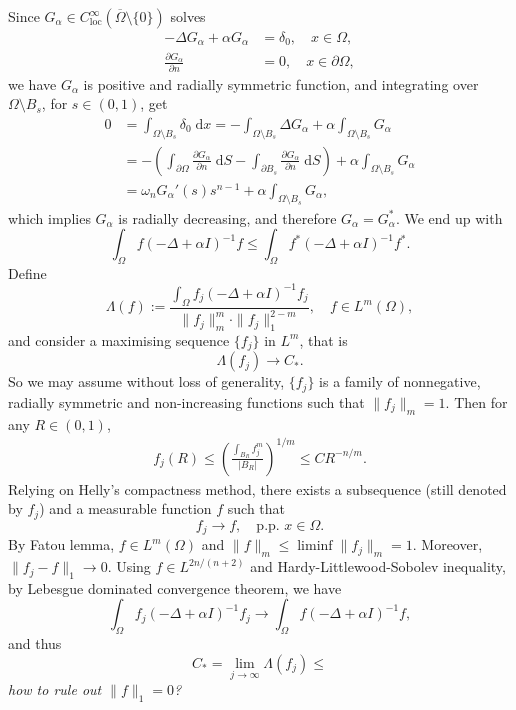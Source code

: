 \documentclass[en,hazy,screen,blue,14pt]{elegantnote}
\numberwithin{dummy}{section}
\newcommand{\dd}{\;\mathrm{d}}
\begin{document}
Since $G_\alpha\in C^{\infty}_{\mathrm{loc}}(\overline{\Omega}\setminus\{0\})$ solves
\begin{align*}
	-\Delta G_\alpha + \alpha G_\alpha &= \delta_0, \quad x\in\Omega,\\
	\frac{\partial G_\alpha}{\partial n} &= 0,\quad x\in\partial\Omega,
\end{align*}
we have $G_\alpha$ is positive and radially symmetric function, 
and integrating over $\Omega\setminus B_s$, for $s\in(0,1)$, get 
\begin{align*}
	0 &= \int_{\Omega\setminus B_s} \delta_0\dd x 
		= - \int_{\Omega\setminus B_s} \Delta G_\alpha + \alpha\int_{\Omega\setminus B_s} G_\alpha\\
		&= -\left(\int_{\partial\Omega}\frac{\partial G_\alpha}{\partial n}\dd S 
			- \int_{\partial B_s}\frac{\partial G_\alpha}{\partial n}\dd S\right) 
			+ \alpha\int_{\Omega\setminus B_s} G_\alpha\\
		&= \omega_n G_\alpha'(s)s^{n-1} + \alpha\int_{\Omega\setminus B_s} G_\alpha,
\end{align*}  
which implies $G_\alpha$ is radially decreasing, and therefore $G_\alpha = G_\alpha^\ast$.
We end up with 
\[
\int_\Omega f(-\Delta + \alpha I)^{-1}f\leq \int_\Omega f^\ast(-\Delta +\alpha I)^{-1}f^\ast.
\]
Define 
\[
\Lambda(f) := \frac{\int_\Omega f_j(-\Delta + \alpha I)^{-1}f_j}{\|f_j\|_m^m\cdot\|f_j\|_1^{2-m}},
	\quad f\in L^m(\Omega),
\]
and consider a maximising sequence $\{f_j\}$ in $L^m$, that is
\[
\Lambda(f_j) \to C_\ast.
\]
So we may assume without loss of generality,
$\{f_j\}$ is a family of nonnegative, radially symmetric and non-increasing functions such that $\|f_j\|_m=1$. 
Then for any $R\in(0,1)$,
\begin{align*}
	f_j(R) \leq \left(\frac{\int_{B_R}f_j^m}{|B_R|}\right)^{1/m}
		\leq CR^{-n/m}.
\end{align*}
Relying on Helly's compactness method, there exists a subsequence (still denoted by $f_j$) 
and a measurable function $f$ such that 
\[
f_j \to f, \quad \text{p.p. } x\in\Omega.
\]
By Fatou lemma, $f\in L^m(\Omega)$ and $\|f\|_m\leq\liminf\|f_j\|_m = 1$. 
Moreover, $\|f_j-f\|_1 \to 0$.
Using $f\in L^{2n/(n+2)}$ and Hardy-Littlewood-Sobolev inequality, by Lebesgue dominated convergence theorem,
we have 
\[
\int_\Omega f_j(-\Delta + \alpha I)^{-1}f_j \to \int_\Omega f (-\Delta + \alpha I)^{-1}f,
\]
and thus 
\[
C_\ast = \lim_{j\to\infty}\Lambda(f_j) \leq 
\]
\emph{how to rule out $\|f\|_1 = 0$?}
\end{document}
